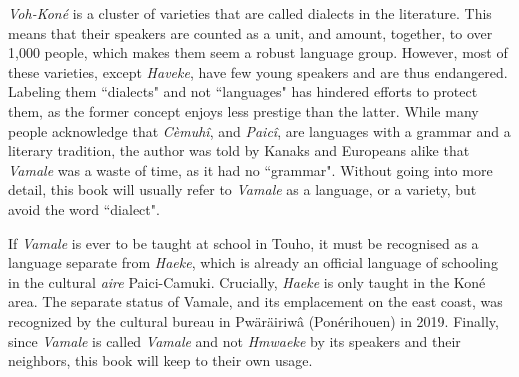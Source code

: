 \textit{Voh-Koné} is a cluster of varieties that are called dialects in the literature. This means that their speakers are counted as a unit, and amount, together, to over 1,000 people, which makes them seem a robust language group. However, most of these varieties, except \textit{Haveke}, have few young speakers and are thus endangered. Labeling them ``dialects" and not ``languages" has hindered efforts to protect them, as the former concept enjoys less prestige than the latter. While many people acknowledge that \textit{Cèmuhî}, and \textit{Paicî}, are languages with a grammar and a literary tradition, the author was told by Kanaks and Europeans alike that \textit{Vamale} was a waste of time, as it had no ``grammar". Without going into more detail, this book will usually refer to \textit{Vamale} as a language, or a variety, but avoid the word ``dialect". %

If \textit{Vamale} is ever to be taught at school in Touho, it must be recognised as a language separate from \textit{Haeke}, which is already an official language of schooling in the cultural \textit{aire} Paici-Camuki. Crucially, \textit{Haeke} is only taught in the Koné area. The separate status of Vamale, and its emplacement on the east coast, was recognized by the cultural bureau in Pwäräiriwâ (Ponérihouen) in 2019. Finally, since \textit{Vamale} is called \textit{Vamale} and not \textit{Hmwaeke} by its speakers and their neighbors, this book will keep to their own usage.


